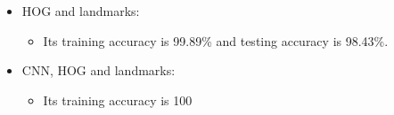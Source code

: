 \begin{enumerate}
\begin{itemize}
    \item HOG and landmarks: 
        \begin{itemize}
            \item Its training accuracy is 99.89\% and testing accuracy is 98.43\%.
        \end{itemize}
    \item CNN, HOG and landmarks: 
       \begin{itemize}
            \item Its training accuracy is 100%
        \end{itemize}
\end{itemize}
\end{enumerate}
